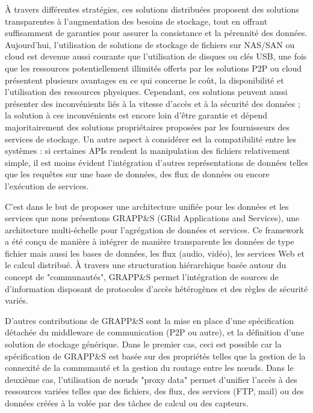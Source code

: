 À travers différentes stratégies, ces solutions distribuées proposent des solutions transparentes à l'augmentation des besoins de stockage, tout en offrant suffisamment de garanties pour assurer la consistance et la pérennité des données. Aujourd'hui, l'utilisation de solutions de stockage de fichiers sur NAS/SAN ou cloud est devenue aussi courante que l'utilisation de disques ou clés USB, une fois que les ressources potentiellement illimités offerts par les solutions P2P ou cloud présentent plusieurs avantages en ce qui concerne le coût, la disponibilité et l'utilisation des ressources physiques. Cependant, ces solutions peuvent aussi présenter des inconvénients liés à la vitesse d'accès et à la sécurité des données ; la solution à ces inconvénients est encore loin d'être garantie et dépend majoritairement des solutions propriétaires proposées par les fournisseurs des services de stockage. Un autre aspect à considérer est la compatibilité entre les systèmes : si certaines APIs rendent la manipulation des fichiers relativement simple, il est moins évident l'intégration d'autres représentations de données telles que les requêtes sur une base de données, des flux de données ou encore l'exécution de services.

C'est dans le but de proposer une architecture unifiée pour les données et les services que nous présentons GRAPP\&S (GRid Applications and Services), une architecture multi-échelle pour l'agrégation de données et services. Ce framework a été conçu de manière à intégrer de manière transparente les données de type fichier mais aussi les bases de données, les flux (audio, vidéo), les services Web et le calcul distribué. À travers une structuration hiérarchique basée autour du concept de "communautés", GRAPP\&S permet l'intégration de sources de d'information disposant de protocoles d'accès hétérogènes et des règles de sécurité variés.

D'autres contributions de GRAPP\&S sont la mise en place d'une spécification détachée du middleware de communication (P2P ou autre), et la définition d'une solution de stockage générique. Dans le premier cas, ceci est possible car la spécification de GRAPP\&S est basée sur des propriétés telles que la gestion de la connexité de la communauté et la gestion du routage entre les n{\oe}uds. Dans le deuxième cas, l'utilisation de n{\oe}uds "proxy data" permet d'unifier l'accès à des ressources variées telles que des fichiers, des flux, des services (FTP, mail) ou des données créées à la volée par des tâches de calcul ou des capteurs.  

